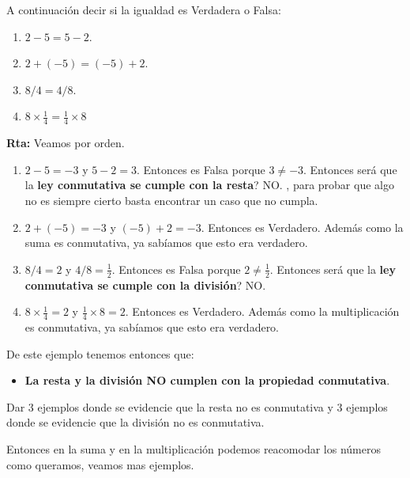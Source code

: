 \begin{ejemplo}
		A continuación decir si la igualdad es Verdadera o Falsa:
		\begin{multicols}{2}
		\begin{enumerate}[label=\Alph*)]
				\item $2-5=5-2$.
				\item $2+(-5)=(-5)+2$.
				\item $8/4=4/8$.
				\item $8\times \frac{1}{4} = \frac{1}{4} \times 8$		
		\end{enumerate}
		\end{multicols}
	
		\textbf{Rta: } Veamos por orden.
		\begin{enumerate}[label=\Alph*)]
				\item $2-5=-3$ y $5-2=3$. Entonces es Falsa porque $3\neq -3$. Entonces será que la \textbf{ley conmutativa se cumple con la resta}? \color{red} NO. \color{black}, para probar que algo no es siempre cierto basta encontrar un caso que no cumpla.
				\item $2+(-5)=-3$ y $(-5)+2=-3$. Entonces es Verdadero. Además como la suma es conmutativa, ya sabíamos que esto era verdadero.
				\item $8/4=2$ y $4/8=\frac{1}{2}$. Entonces es Falsa porque $2\neq \frac{1}{2}$. Entonces será que la \textbf{ley conmutativa se cumple con la división}? \color{red} NO. \color{black}
				\item $8\times \frac{1}{4} = 2$ y $\frac{1}{4} \times 8=2$. Entonces es Verdadero. Además como la multiplicación es conmutativa, ya sabíamos que esto era verdadero.	
		\end{enumerate}
\end{ejemplo}

De este ejemplo tenemos entonces que:
\begin{itemize}
	\item \textbf{La resta y la división \color{red} NO \color{black} cumplen con la propiedad conmutativa}.
\end{itemize}

\begin{exer}
		Dar 3 ejemplos donde se evidencie que la resta no es conmutativa y 3 ejemplos donde se evidencie que la división no es conmutativa.
\end{exer}

Entonces en la suma y en la multiplicación podemos reacomodar los números como queramos, veamos mas ejemplos.

